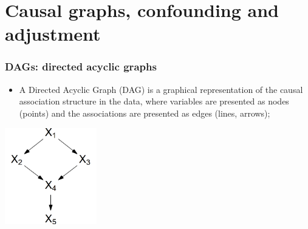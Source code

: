 \documentclass[10pt,dvipsnames,t,handout%
,aspectratio=169%
]{beamer}%
\begin{document}
\section{Causal graphs, confounding and adjustment}

\begin{frame}
	\frametitle{DAGs: directed acyclic graphs}
	\begin{itemize}
		\item A Directed Acyclic Graph (DAG) is a graphical representation of the causal association structure in the data, where variables are presented as nodes (points) and the associations are presented as edges (lines, arrows);
	\end{itemize}
\begin{center} 
{\includegraphics[width=0.3\textwidth]{pearlexample}}\\
\end{center} 

\end{frame}
\end{document}
